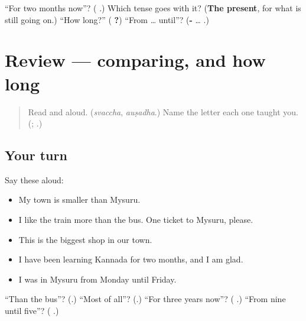 \begin{tcolorbox}[breakable,colback=teal!4,colframe=teal!35!black,title={Before you move on}]
\textquotedblleft{}For two months now\textquotedblright{}? (\textbf{ }.) Which tense goes with it? (\textbf{The present}, for what is still going on.) \textquotedblleft{}How long?\textquotedblright{} (\textbf{ ?}) \textquotedblleft{}From … until\textquotedblright{}? (\textbf{-} … \textbf{}.)
\end{tcolorbox}
\section[(review)]{Review — comparing, and how long}

\label{lesson:KA-R316-comparing-and-time}



\begin{quote}
Read \textbf{} and \textbf{} aloud. (\emph{svaccha}, \emph{auṣadha}.) Name the letter each one taught you. (\textbf{}; \textbf{}.)
\end{quote}

\subsection*{Your turn}
Say these aloud:

\begin{itemize}
\raggedright
  \item My town is smaller than Mysuru.
  \item I like the train more than the bus. One ticket to Mysuru, please.
  \item This is the biggest shop in our town.
  \item I have been learning Kannada for two months, and I am glad.
  \item I was in Mysuru from Monday until Friday.
\end{itemize}

\begin{tcolorbox}[breakable,colback=teal!4,colframe=teal!35!black,title={Before you move on}]
\textquotedblleft{}Than the bus\textquotedblright{}? (\textbf{}.) \textquotedblleft{}Most of all\textquotedblright{}? (\textbf{}.) \textquotedblleft{}For three years now\textquotedblright{}? (\textbf{ }.) \textquotedblleft{}From nine until five\textquotedblright{}? (\textbf{   }.)
\end{tcolorbox}
